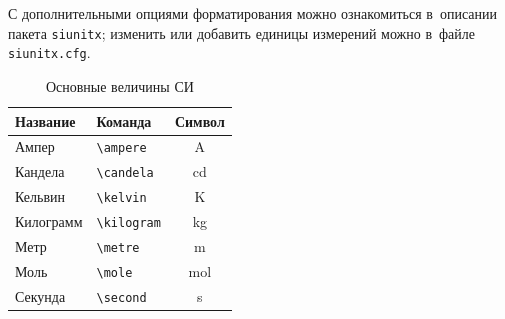 С дополнительными опциями форматирования можно ознакомиться в~описании пакета \texttt{siunitx};
изменить или добавить единицы измерений можно в~файле \texttt{siunitx.cfg}.

\begin{table}
    \centering
    \captionsetup{justification=centering} %
    \caption{Основные величины СИ}\label{tab:unit:base}
    \begin{tabular}{llc}
        \toprule
        Название  & Команда          & Символ         \\
        \midrule
        Ампер     & \verb|\ampere|   & \si{\ampere}   \\
        Кандела   & \verb|\candela|  & \si{\candela}  \\
        Кельвин   & \verb|\kelvin|   & \si{\kelvin}   \\
        Килограмм & \verb|\kilogram| & \si{\kilogram} \\
        Метр      & \verb|\metre|    & \si{\metre}    \\
        Моль      & \verb|\mole|     & \si{\mole}     \\
        Секунда   & \verb|\second|   & \si{\second}   \\
        \bottomrule
    \end{tabular}
\end{table}

